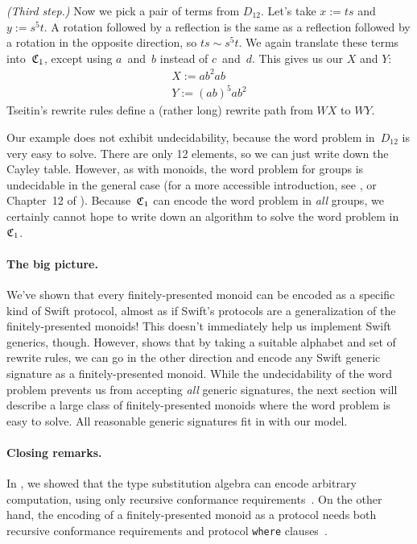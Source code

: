\documentclass[../generics]{subfiles}
\begin{document}
\smallskip

\emph{(Third step.)} Now we pick a pair of terms from $D_{12}$. Let's take $x:=ts$ and $y:=s^5t$. A rotation followed by a reflection is the same as a reflection followed by a rotation in the opposite direction, so $ts\sim s^5t$. We again translate these terms into~$\mathfrak{C}_1$, except using $a$~and~$b$ instead of $c$~and~$d$. This gives us our $X$ and $Y$:
\begin{gather*}
X := ab^2ab\\
Y := (ab)^5ab^2
\end{gather*}
Tseitin's rewrite rules define a (rather long) rewrite path from $W\! X$ to $WY$.

Our example does not exhibit undecidability, because the word problem in~$D_{12}$ is very easy to solve. There are only 12 elements, so we can just write down the Cayley table. However, as with monoids, the word problem for groups is undecidable in the general case \cite{undecidablegroup} (for a more accessible introduction, see \cite{undecidablegroup2}, or Chapter~12 of \cite{rotman}). Because~$\mathfrak{C}_1$ can encode the word problem in \emph{all} groups, we certainly cannot hope to write down an algorithm to solve the word problem in~$\mathfrak{C}_1$.

\paragraph{The big picture.} We've shown that every finitely-presented monoid can be encoded as a specific kind of Swift protocol, almost as if Swift's protocols are a generalization of the finitely-presented monoids! This doesn't immediately help us implement Swift generics, though. However,  shows that by taking a suitable alphabet and set of rewrite rules, we can go in the other direction and encode any Swift generic signature as a finitely-presented monoid. While the undecidability of the word problem prevents us from accepting \emph{all} generic signatures, the next section will describe a large class of finitely-presented monoids where the word problem is easy to solve. All reasonable generic signatures fit in with our model.

\paragraph{Closing remarks.} In , we showed that the type substitution algebra can encode arbitrary computation, using only recursive conformance requirements~\cite{se0157}. On the other hand, the encoding of a finitely-presented monoid as a protocol needs both recursive conformance requirements and protocol \texttt{where} clauses~\cite{se0142}.
\end{document}
